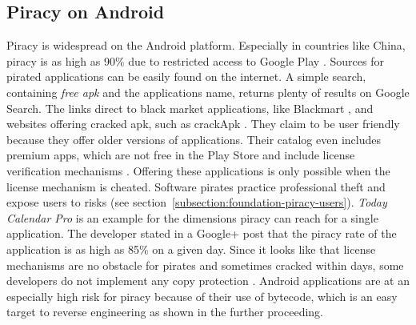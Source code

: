 \subsection{Piracy on Android} \label{subsection:foundation-piracy-android}
Piracy is widespread on the Android platform.
Especially in countries like China, piracy is as high as 90\% due to restricted access to Google Play \cite{piracyRate}.
Sources for pirated applications can be easily found on the internet.
A simple search, containing \textit{free apk} and the applications name, returns plenty of results on Google Search.
The links direct to black market applications, like Blackmart \cite{blackmartStore}, and websites offering cracked \gls{apk}, such as crackApk \cite{crackApk}.
They claim to be user friendly because they offer  older versions of applications.
Their catalog even includes premium apps, which are not free in the Play Store and include license verification mechanisms \cite{apksfree}.
Offering these applications is only possible when the license mechanism is cheated.
Software pirates practice professional theft and expose users to risks (see section~\ref{subsection:foundation-piracy-users}).
\newline
\textit{Today Calendar Pro} is an example for the dimensions piracy can reach for a single application.
The developer stated in a Google+ post that the piracy rate of the application is as high as 85\% on a given day. \cite{xdaPiracy} \cite{developersPiracy}
Since it looks like that license mechanisms are no obstacle for pirates and sometimes cracked within days, some developers do not implement any copy protection \cite{recodeMonument}.
\newline
Android applications are at an especially high risk for piracy because of their use of bytecode, which is an easy target to reverse engineering as shown in the further proceeding.

